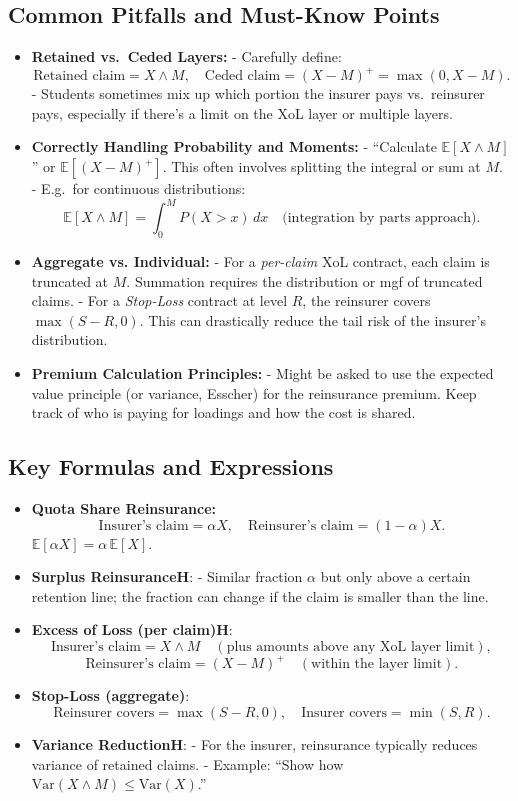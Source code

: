 \documentclass[13pt,a4paper]{article}
\begin{document}
\subsection{Common Pitfalls and Must-Know Points}
\begin{itemize}
  \item \textbf{Retained vs.\ Ceded Layers:}
    - Carefully define:
      \[
        \text{Retained claim} = X \wedge M, 
        \quad
        \text{Ceded claim} = (X - M)^+ = \max(0, X - M).
      \]
    - Students sometimes mix up which portion the insurer pays vs.\ reinsurer pays, especially if there’s a limit on the XoL layer or multiple layers.
  \item \textbf{Correctly Handling Probability and Moments:}
    - “Calculate \(\mathbb{E}[X \wedge M]\)” or \(\mathbb{E}[(X-M)^+]\). This often involves splitting the integral or sum at \(M\).  
    - E.g.\ for continuous distributions:
      \[
        \mathbb{E}[X \wedge M] 
        = \int_0^M P(X> x)\,dx 
        \quad \text{(integration by parts approach).}
      \]
  \item \textbf{Aggregate vs. Individual:}
    - For a \emph{per-claim} XoL contract, each claim is truncated at \(M\). Summation requires the distribution or mgf of truncated claims.  
    - For a \emph{Stop-Loss} contract at level \(R\), the reinsurer covers \(\max(S-R,0)\). This can drastically reduce the tail risk of the insurer’s distribution.
  \item \textbf{Premium Calculation Principles:}
    - Might be asked to use the expected value principle (or variance, Esscher) for the reinsurance premium. Keep track of who is paying for loadings and how the cost is shared.
\end{itemize}

\subsection{Key Formulas and Expressions}
\begin{itemize}
  \item \textbf{Quota Share Reinsurance:}
    \[
      \text{Insurer’s claim} = \alpha X,\quad
      \text{Reinsurer’s claim} = (1-\alpha)X.
    \]
    \(\mathbb{E}[\alpha X]=\alpha\,\mathbb{E}[X]\).  
  \item \textbf{Surplus ReinsuranceH}: 
    - Similar fraction \(\alpha\) but only above a certain retention line; the fraction can change if the claim is smaller than the line.
  \item \textbf{Excess of Loss (per claim)H}:
    \[
      \text{Insurer’s claim} = X \wedge M \quad (\text{plus amounts above any XoL layer limit}),
    \]
    \[
      \text{Reinsurer’s claim} = (X - M)^+ \quad (\text{within the layer limit}).
    \]
  \item \textbf{Stop-Loss (aggregate)}:
    \[
      \text{Reinsurer covers} = \max(S-R,0), 
      \quad
      \text{Insurer covers} = \min(S,R).
    \]
  \item \textbf{Variance ReductionH}:
    - For the insurer, reinsurance typically reduces variance of retained claims. 
    - Example: “Show how \(\mathrm{Var}(X\wedge M)\le \mathrm{Var}(X)\).”
\end{itemize}
\end{document}

